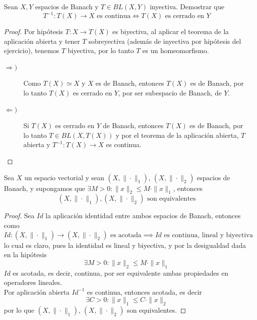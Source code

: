 \begin{ejercicio}
    Sean $X, Y$ espacios de Banach y $T \in BL(X, Y)$ inyectiva. Demostrar que 
    \begin{equation*}
        T^{-1}: T(X) \to X \text{ es continua} \iff T(X) \text{ es cerrado en } Y
    \end{equation*}
\begin{proof}
    Por hipótesis $T: X \to T(X)$ es biyectiva, al aplicar el teorema de la aplicación abierta y tener $T$ sobreyectiva (además de inyectiva por hipótesis del ejercicio), tenemos $T$ biyectiva, por lo tanto $T$ es un homeomorfismo.
    \begin{description}
        \item[$\Longrightarrow )$] Como $T(X) \simeq X$ y $X$ es de Banach, entonces $T(X)$ es de Banach, por lo tanto $T(X)$ es cerrado en $Y$, por ser subespacio de Banach, de $Y$.
        \item[$\Longleftarrow )$] Si $T(X)$ es cerrado en $Y$ de Banach, entonces $T(X)$ es de Banach, por lo tanto \mbox{$T \in BL(X, T(X))$} y por el teorema de la aplicación abierta, $T$ abierta y $T^{-1}:T(X)\to X$ es continua.
    \end{description}
\end{proof}
\end{ejercicio}

\begin{coro}\label{coro:equivalencia-normas}
    Sea $X$ un espacio vectorial y sean $(X, \|\cdot\|_1)$, $(X, \|\cdot\|_2)$ espacios de Banach, y supongamos que $\exists M > 0 : \|x\|_2 \leq M \cdot \|x\|_1$, entonces
    \begin{equation*}
        (X, \|\cdot\|_1), (X, \|\cdot\|_2) \text{ son equivalentes}
    \end{equation*}
\begin{proof}
    Sea $Id$ la aplicación identidad entre ambos espacios de Banach, entonces como
    \begin{equation*}
        Id: (X, \|\cdot\|_1) \longrightarrow (X, \|\cdot\|_2) \text{ es acotada} \implies Id \text{ es continua, lineal y biyectiva}
    \end{equation*}
    lo cual es claro, pues la identidad es lineal y biyectiva, y por la desigualdad dada en la hipótesis
    \begin{equation*}
        \exists M > 0 : \|x\|_2 \leq M \cdot \|x\|_1
    \end{equation*}
    $Id$ es acotada, es decir, continua, por ser equivalente ambas propiedades en operadores lineales. \\
    \noindent
    Por aplicación abierta $Id^{-1}$ es continua, entonces acotada, es decir
    \begin{equation*}
        \exists C > 0 : \|x\|_1 \leq C \cdot \|x\|_2
    \end{equation*}
    por lo que $(X, \|\cdot\|_1)$, $(X, \|\cdot\|_2)$ son equivalentes.
\end{proof}
\end{coro}

